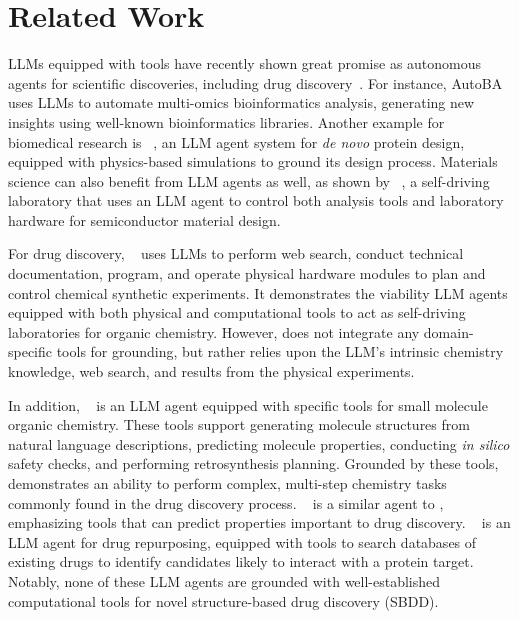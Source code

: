 \section{Related Work}

LLMs equipped with tools
have recently shown great promise as autonomous agents for scientific discoveries, including
drug discovery~\cite{gao_empowering_2024}.
%
For instance, AutoBA~\cite{zhou_automated_2023} uses LLMs
to automate multi-omics bioinformatics analysis,
generating new insights using well-known bioinformatics 
libraries.
%
Another example for biomedical research is \protagent~\cite{ghafarollahi_protagents_2024}, an LLM agent system for \emph{de novo} protein design, equipped with physics-based simulations to ground its design process.
%
Materials science can also benefit from LLM agents as well, as shown by
\alab~\cite{szymanski_autonomous_2023}, a self-driving laboratory that uses an LLM agent to control both analysis tools and laboratory hardware for semiconductor material design.

%
For drug discovery, 
\coscientist~\cite{boiko_autonomous_2023} uses LLMs to perform web search,
conduct technical documentation, program, and operate physical hardware modules
to plan and control chemical synthetic experiments.
%
It demonstrates the viability LLM agents equipped with both physical and computational tools to 
act as self-driving laboratories for organic chemistry. 
%
However, \coscientist does not integrate any domain-specific tools for grounding, but rather relies upon the LLM's intrinsic chemistry knowledge, web search, and results from the physical experiments.

In addition, \chemcrow~\cite{m_bran_augmenting_2024} is an LLM agent equipped with specific tools for small molecule organic chemistry.
These tools support generating molecule structures from natural language descriptions, predicting molecule properties,
conducting \emph{in silico} safety checks, and performing retrosynthesis planning.
Grounded by these tools, \chemcrow demonstrates an ability to perform complex, multi-step chemistry tasks commonly found in the drug discovery process. 
%
\cactus~\cite{mcnaughton_cactus_2024} is a similar agent to \chemcrow,
emphasizing tools that can predict properties important to drug discovery.
%
\drugagent~\cite{inoue_drugagent_2024} is an LLM agent for drug repurposing, equipped with tools to search databases of existing drugs to identify candidates likely to interact with a protein target.
%
Notably, none of these LLM agents are grounded with well-established computational tools for 
novel structure-based drug discovery (SBDD).  


